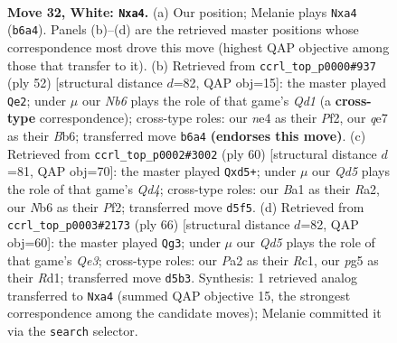 \documentclass[11pt]{article}
\begin{document}
\clearpage

\begin{figure}[p]\centering
\begin{subfigure}{0.46\textwidth}\centering
\resizebox{\linewidth}{!}{%
\newchessgame
\chessboard[
  setfen={1rb2k2/1p2q2p/1Nr5/1R1Q2p1/p3n3/4P1P1/P4PKP/B3R3 w - - 5 32},
  showmover=false,
  pgfstyle=straightmove, color=movearrow, markmove={b6-a4}
]}
\caption{}
\end{subfigure}\hfill
\begin{subfigure}{0.46\textwidth}\centering
\resizebox{\linewidth}{!}{%
\newchessgame
\chessboard[
  setfen={2r3k1/1p1q2p1/pB1bp3/P2r3p/8/6P1/1P3P1P/R2QR1K1 w - - 4 27},
  showmover=false,
  pgfstyle=straightmove, color=movearrow, markmove={d1-e2}
]}
\caption{}
\end{subfigure}
\\[4pt]
\begin{subfigure}{0.46\textwidth}\centering
\resizebox{\linewidth}{!}{%
\newchessgame
\chessboard[
  setfen={1r2r1k1/6p1/p1q2p1p/3b4/PPpQn3/4P1P1/R4PBP/3R2K1 w - - 0 31},
  showmover=false,
  pgfstyle=straightmove, color=movearrow, markmove={d4-d5}
]}
\caption{}
\end{subfigure}\hfill
\begin{subfigure}{0.46\textwidth}\centering
\resizebox{\linewidth}{!}{%
\newchessgame
\chessboard[
  setfen={3b4/3n2k1/r2P2pp/p3p3/1pN2r1q/1P2Q3/5PBP/2RR2K1 w - - 2 34},
  showmover=false,
  pgfstyle=straightmove, color=movearrow, markmove={e3-g3}
]}
\caption{}
\end{subfigure}
\caption{\textbf{Move 32, White: \texttt{Nxa4}.} (a) Our position; Melanie plays \texttt{Nxa4} (\texttt{b6a4}). Panels (b)--(d) are the retrieved master positions whose correspondence most drove this move (highest QAP objective among those that transfer to it). (b) Retrieved from \texttt{ccrl\_top\_p0000\#937} (ply 52) [structural distance $d$=82, QAP obj=15]: the master played \texttt{Qe2}; under $\mu$ our \emph{Nb6} plays the role of that game's \emph{Qd1} (a \textbf{cross-type} correspondence); cross-type roles: our \emph{n}e4 as their \emph{P}f2, our \emph{q}e7 as their \emph{B}b6; transferred move \texttt{b6a4} \textbf{(endorses this move)}. (c) Retrieved from \texttt{ccrl\_top\_p0002\#3002} (ply 60) [structural distance $d$=81, QAP obj=70]: the master played \texttt{Qxd5+}; under $\mu$ our \emph{Qd5} plays the role of that game's \emph{Qd4}; cross-type roles: our \emph{B}a1 as their \emph{R}a2, our \emph{N}b6 as their \emph{P}f2; transferred move \texttt{d5f5}. (d) Retrieved from \texttt{ccrl\_top\_p0003\#2173} (ply 66) [structural distance $d$=82, QAP obj=60]: the master played \texttt{Qg3}; under $\mu$ our \emph{Qd5} plays the role of that game's \emph{Qe3}; cross-type roles: our \emph{P}a2 as their \emph{R}c1, our \emph{p}g5 as their \emph{R}d1; transferred move \texttt{d5b3}. Synthesis: 1 retrieved analog transferred to \texttt{Nxa4} (summed QAP objective 15, the strongest correspondence among the candidate moves); Melanie committed it via the \texttt{search} selector.}
\label{fig:thought-m62}
\end{figure}
\end{document}

